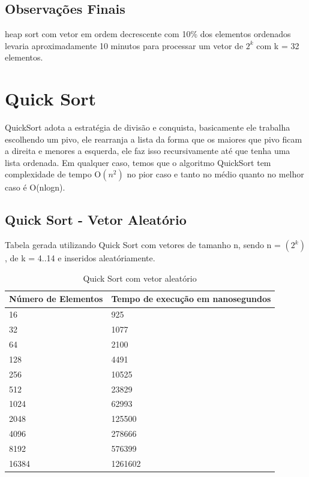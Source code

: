 \documentclass[12pt,a4paper,twoside]{report}
\begin{document}
\section{Observações Finais}
heap sort com vetor em ordem decrescente com 10\% dos elementos ordenados levaria aproximadamente 10 minutos para processar um vetor de $2^k$ com k = 32 elementos.

\chapter{Quick Sort}
QuickSort adota a estratégia de divisão e conquista, basicamente ele trabalha escolhendo um pivo, ele rearranja a lista da forma que os maiores que pivo ficam a direita e menores a esquerda, ele faz isso recursivamente até que tenha uma lista ordenada.
Em qualquer caso, temos que o algoritmo QuickSort tem complexidade de tempo O$(n^2)$ no pior caso e tanto no médio quanto no melhor caso é O(nlogn).

\section{Quick Sort - Vetor Aleatório}
Tabela gerada utilizando Quick Sort com vetores de tamanho n, sendo n = $(2^k)$, de k = 4..14 e inseridos aleatóriamente.
\begin{table}[H]
\centering
\caption{Quick Sort com vetor aleatório}
\label{my-label}
\begin{tabular}{|l|l|}
\hline
\multicolumn{1}{|c|}{\textbf{Número de Elementos}} & \multicolumn{1}{c|}{\textbf{Tempo de execução em nanosegundos}} \\ \hline
16 & 925 \\ \hline
32 & 1077 \\ \hline
64 & 2100 \\ \hline
128 & 4491 \\ \hline
256 & 10525 \\ \hline
512 & 23829 \\ \hline
1024 & 62993 \\ \hline
2048 & 125500 \\ \hline
4096 & 278666 \\ \hline
8192 & 576399 \\ \hline
16384 & 1261602 \\ \hline
\end{tabular}
\end{table}
\end{document}
